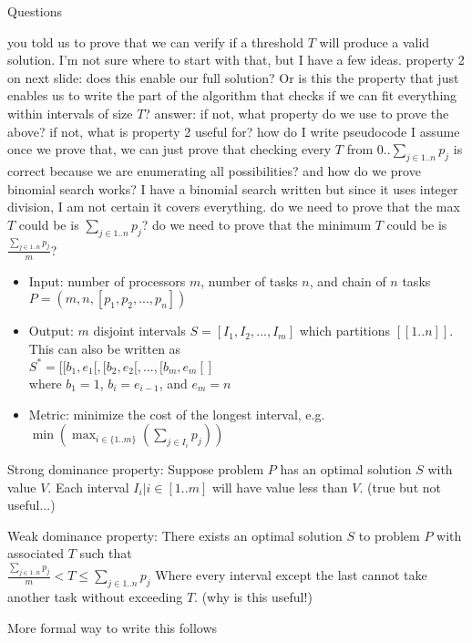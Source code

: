 \documentclass[landscape]{slides}
\begin{document}
\begin{slide}
  Questions
  \begin{outline}
    \1 you told us to prove that we can verify if a threshold $T$ will
    produce a valid solution. I'm not sure where to start with that, but I have
    a few ideas.
    \1 property 2 on next slide: does this enable our full solution? Or is
    this the property that just enables us to write the part of the algorithm
    that checks if we can fit everything within intervals of size $T$?
      \2 answer: 
      \2 if not, what property do we use to prove the above?
      \2 if not, what is property 2 useful for?
    \1 how do I write pseudocode
    \1 I assume once we prove that, we can just prove that checking every 
    $T$ from $0..\sum_{j \in 1..n} p_j$ is correct because we are enumerating
    all possibilities?
    \1 and how do we prove binomial search works? I have a binomial search
    written but since it uses integer division, I am not certain it covers
    everything. 
    \1 do we need to prove that the max $T$ could be is $\sum_{j \in 1..n}
    p_j$?
    \1 do we need to prove that the minimum $T$ could be is $\frac{\sum_{j
    \in 1..n} p_j}{m}$?
  \end{outline}
\end{slide}

\begin{slide} %
	\begin{itemize}
    \item Input: number of processors $m$, number of tasks $n$, and chain of
    			$n$ tasks $P = (m, n, [p_1, p_2, ..., p_n])$
    \item Output: $m$ disjoint intervals  $S = [I_1, I_2, ..., I_m]$ which
          partitions $[[1..n]]$. This can also be written as 
          \\$S^* = [[b_1,e_1[, [b_2,e_2[, ... , [b_m,e_m[]$ 
          \\where $b_1 = 1$, $b_i = e_{i-1}$, and $e_m = n$
    \item Metric: minimize the cost of the longest interval, e.g.
					$\min(\max_{i\in\{1..m\}}(\sum_{j \in{I_i}} p_j))$
	\end{itemize}
\end{slide}

\begin{slide} %
  Strong dominance property: Suppose problem $P$ has an optimal solution $S$
  with value $V$. Each interval $I_i | i \in [1..m]$ will have value less than
  $V$. (true but not useful...)

  Weak dominance property: There exists an optimal solution $S$ to problem $P$
  with associated $T$ such that
  \\$\frac{\sum_{j \in 1..n} p_j}{m} < T \leq \sum_{j \in 1..n} p_j$ 
  Where every interval except the last cannot take another task without
  exceeding $T$. (why is this useful!)

  More formal way to write this follows
\end{slide}
\end{document}
